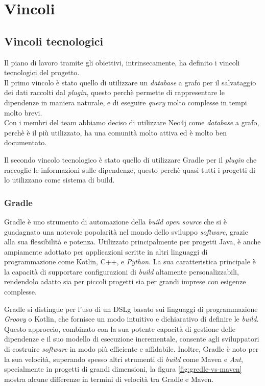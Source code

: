 \section{Vincoli}
  \subsection*{ Vincoli tecnologici}

  Il piano di lavoro tramite gli obiettivi, intrinsecamente, ha definito i vincoli tecnologici del progetto.\\
  Il primo vincolo è stato quello di utilizzare un \textit{database} a grafo per il salvataggio dei dati raccolti dal \textit{plugin},
  questo perchè permette di rappresentare le dipendenze in maniera naturale, e di eseguire \textit{query} molto complesse in tempi molto brevi.\\
  Con i membri del team abbiamo deciso di utilizzare Neo4j come \textit{database} a grafo, perchè è il più utilizzato, ha una comunità molto attiva
ed è molto ben documentato.

Il secondo vincolo tecnologico è stato quello di utilizzare Gradle per il \textit{plugin} che raccoglie le informazioni sulle dipendenze,
questo perchè quasi tutti i progetti di {\azienda} lo utilizzano come sistema di build.\\

\subsubsection*{Gradle}
  Gradle è uno strumento di automazione della \textit{build} \textit{open source} che si è guadagnato una notevole popolarità nel mondo 
dello sviluppo \textit{software}, grazie alla sua flessibilità e potenza. Utilizzato principalmente per progetti Java, 
è anche ampiamente adottato per applicazioni scritte in altri linguaggi di programmazione come Kotlin, C++, e \textit{Python}. 
La sua caratteristica principale è la capacità di supportare configurazioni di \textit{build} altamente personalizzabili, 
rendendolo adatto sia per piccoli progetti sia per grandi imprese con esigenze complesse.

Gradle si distingue per l'uso di un \gls{DSLg} basato sui linguaggi di programmazione \textit{Groovy} o Kotlin,
 che fornisce un modo intuitivo e dichiarativo di definire le \textit{build}. Questo approccio, combinato con la sua potente capacità di 
 gestione delle dipendenze e il suo modello di esecuzione incrementale, consente agli sviluppatori di costruire \textit{software} in modo più 
 efficiente e affidabile. Inoltre, Gradle è noto per la sua velocità, superando spesso altri strumenti di \textit{build} come Maven 
 e \textit{Ant}, specialmente in progetti di grandi dimensioni, la figura \ref*{fig:gredle-vs-maven} mostra alcune differenze in termini di velocità 
 tra Gradle e Maven.

